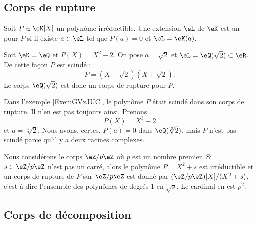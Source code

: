 \subsection{Corps de rupture}

\begin{definition}
    Soit \( P\in\eK[X]\) un polynôme irréductible. Une extension \( \eL\) de \( \eK\) est un  pour \( P\) si il existe \( a\in \eL\) tel que \( P(a)=0\) et \( \eL=\eK(a)\).
\end{definition}

\begin{example}     \label{ExemGVxJUC}
    Soit \( \eK=\eQ\) et \( P(X)=X^2-2\). On pose \( a=\sqrt{2}\) et \( \eL=\eQ(\sqrt{2})\subset\eR\). De cette façon \( P\) est scindé :
    \begin{equation}
        P=(X-\sqrt{2})(X+\sqrt{2}).
    \end{equation}
    Le corps \( \eQ(\sqrt{2})\) est donc un corps de rupture pour \( P\).
\end{example}

\begin{example}
    Dans l'exemple \ref{ExemGVxJUC}, le polynôme \( P\) était scindé dans son corps de rupture. Il n'en est pas toujours ainsi. Prenons 
    \begin{equation}
        P(X)=X^3-2
    \end{equation}
    et \( a=\sqrt[3]{2}\). Nous avons, certes, \( P(a)=0\) dans \( \eQ(\sqrt[3]{2})\), mais \( P\) n'est pas scindé parce qu'il y a deux racines complexes.
\end{example}

\begin{example}
    Nous considérons le corps \( \eZ/p\eZ\) où \( p\) est un nombre premier. Si \( s\in \eZ/p\eZ\) n'est pas un carré, alors le polynôme \(P= X^2+s\) est irréductible et un corps de rupture de \( P\) sur \( \eZ/p\eZ\) est donné par \( (\eZ/p\eZ)[X]/(X^2+s)\), c'est à dire l'ensemble des polynômes de degrés \( 1\) en \( \sqrt{s}\). Le cardinal en est \( p^2\).
\end{example}

\subsection{Corps de décomposition}

